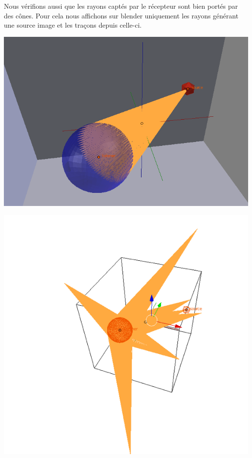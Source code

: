 Nous vérifions aussi que les rayons captés par le récepteur sont bien portés par des cônes. Pour cela nous affichons sur blender uniquement les rayons générant une source image et les traçons depuis celle-ci.

\begin{figureth}
	\begin{subfigureth}{0.45\textwidth}
		\includegraphics[width=\linewidth]{images/testBeam}
		\caption{Propagation des rayons depuis la source vers le récepteur (100000 rayons au total)}
		\label{testBeam}
	\end{subfigureth}
	\quad
	\begin{subfigureth}{0.45\textwidth}
		\includegraphics[width=\linewidth]{images/testBeam2}
		\caption{Propagation des rayons depuis les sources-images vers le récepteur à l'ordre 0 et 1  (100000 rayons au total)}
		\label{testBeam2}
	\end{subfigureth}
\end{figureth}

